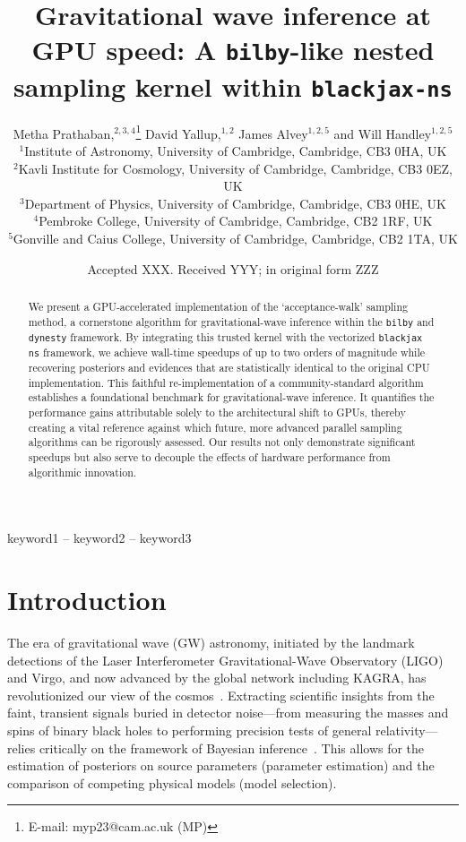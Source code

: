 \documentclass[fleqn,usenatbib]{mnras}
\title[GPU-accelerated nested sampling for gravitational waves]{Gravitational wave inference at GPU speed: A \texttt{bilby}-like nested sampling kernel within \texttt{blackjax-ns}}
\author[Metha Prathaban et al.]{
Metha Prathaban,$^{2,3,4}$\thanks{E-mail: myp23@cam.ac.uk (MP)}
David Yallup,$^{1,2}$
James Alvey$^{1,2,5}$
and Will Handley$^{1,2,5}$
\\
$^{1}$Institute of Astronomy, University of Cambridge, Cambridge, CB3 0HA, UK\\
$^{2}$Kavli Institute for Cosmology, University of Cambridge, Cambridge, CB3 0EZ, UK\\
$^{3}$Department of Physics, University of Cambridge, Cambridge, CB3 0HE, UK\\
$^{4}$Pembroke College, University of Cambridge, Cambridge, CB2 1RF, UK\\
$^{5}$Gonville and Caius College, University of Cambridge, Cambridge, CB2 1TA, UK\\
}
\date{Accepted XXX. Received YYY; in original form ZZZ}
\begin{document}
\label{firstpage}
\pagerange{\pageref{firstpage}--\pageref{lastpage}}
\maketitle

\begin{abstract}
We present a GPU-accelerated implementation of the `acceptance-walk'
sampling method, a cornerstone algorithm for gravitational-wave
inference within the \texttt{bilby} and \texttt{dynesty} framework.
By integrating this trusted kernel with the vectorized \texttt{blackjax ns}
framework, we achieve wall-time speedups of up to two orders of
magnitude while recovering posteriors and evidences that are
statistically identical to the original CPU implementation. This faithful
re-implementation of a community-standard algorithm establishes a foundational
benchmark for gravitational-wave inference. It quantifies the
performance gains attributable solely to the architectural shift to GPUs,
thereby creating a vital reference against which future, more advanced parallel
sampling algorithms can be rigorously assessed. Our results not only
demonstrate significant speedups but also serve to decouple the
effects of hardware performance from algorithmic innovation.
\end{abstract}

\begin{keywords}
keyword1 -- keyword2 -- keyword3
\end{keywords}



\section{Introduction}


The era of gravitational wave (GW) astronomy, initiated by the landmark
detections of the Laser Interferometer Gravitational-Wave Observatory (LIGO) and
Virgo, and now advanced by the global network including KAGRA, has revolutionized
our view of the cosmos~\citep{GW150914, GW170817,GWTC1,GWTC2, GWTC3,GWTC3_pop_analysis,GWTC2_GR,siren}. 
Extracting scientific insights from the faint, transient signals buried in detector noise—from measuring the
masses and spins of binary black holes to performing precision tests of general
relativity—relies critically on the framework of Bayesian inference~\citep{Thrane_2019}. 
This allows for the estimation of posteriors on source parameters
(parameter estimation) and the comparison of competing physical models (model selection).
\end{document}
